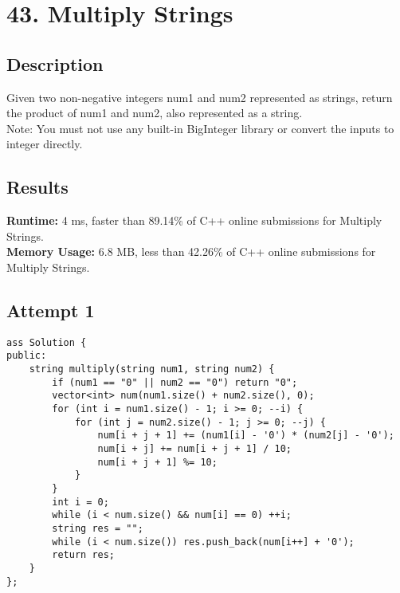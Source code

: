 \chapter{43. Multiply Strings}
\section{Description}
Given two non-negative integers num1 and num2 represented as strings, return the product of num1 and num2, also represented as a string.
\\
Note: You must not use any built-in BigInteger library or convert the inputs to integer directly.
\section{Results}
\textbf{Runtime:}
4 ms, faster than 89.14\% of C++ online submissions for Multiply Strings.\\
\textbf{Memory Usage:}
6.8 MB, less than 42.26\% of C++ online submissions for Multiply Strings.\\
\newpage
\section{Attempt 1}
\begin{lstlisting}
ass Solution {
public:
    string multiply(string num1, string num2) {
        if (num1 == "0" || num2 == "0") return "0";
        vector<int> num(num1.size() + num2.size(), 0);
        for (int i = num1.size() - 1; i >= 0; --i) {
            for (int j = num2.size() - 1; j >= 0; --j) {
                num[i + j + 1] += (num1[i] - '0') * (num2[j] - '0');
                num[i + j] += num[i + j + 1] / 10;
                num[i + j + 1] %= 10;
            }
        }
        int i = 0;
        while (i < num.size() && num[i] == 0) ++i;
        string res = "";
        while (i < num.size()) res.push_back(num[i++] + '0');
        return res;
    }
};
\end{lstlisting}
